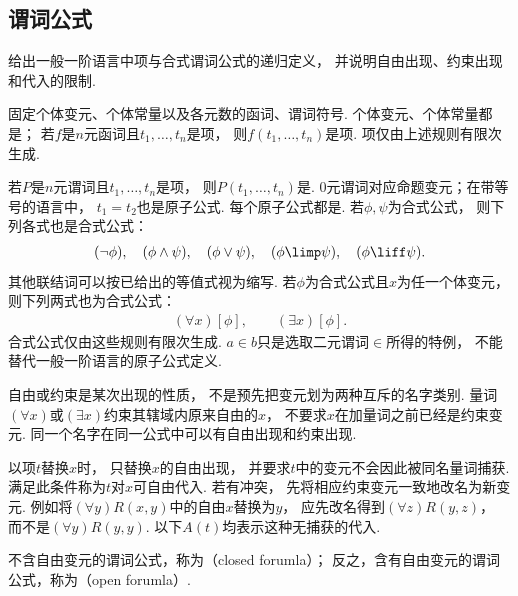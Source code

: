 \subsection{谓词公式}
\begin{example}
    给出一般一阶语言中项与合式谓词公式的递归定义，
    并说明自由出现、约束出现和代入的限制.
    \begin{solution}
        固定个体变元、个体常量以及各元数的函词、谓词符号.
        个体变元、个体常量都是；
        若\(f\)是\(n\)元函词且\(t_1,\dotsc,t_n\)是项，
        则\(f(t_1,\dotsc,t_n)\)是项.
        项仅由上述规则有限次生成.

        若\(P\)是\(n\)元谓词且\(t_1,\dotsc,t_n\)是项，
        则\(P(t_1,\dotsc,t_n)\)是.
        \(0\)元谓词对应命题变元；在带等号的语言中，
        \(t_1=t_2\)也是原子公式.
        每个原子公式都是.
        若\(\phi,\psi\)为合式公式，
        则下列各式也是合式公式：
        \begin{align*}
            (\neg\phi),\quad(\phi\land\psi),\quad(\phi\lor\psi),\quad
            (\phi\limp\psi),\quad(\phi\liff\psi).
        \end{align*}
        其他联结词可以按已给出的等值式视为缩写.
        若\(\phi\)为合式公式且\(x\)为任一个体变元，
        则下列两式也为合式公式：
        \begin{align*}
            (\forall x)[\phi],\qquad(\exists x)[\phi].
        \end{align*}
        合式公式仅由这些规则有限次生成.
        \(a\in b\)只是选取二元谓词\(\in\)所得的特例，
        不能替代一般一阶语言的原子公式定义.

        自由或约束是某次出现的性质，
        不是预先把变元划为两种互斥的名字类别.
        量词\((\forall x)\)或\((\exists x)\)约束其辖域内原来自由的\(x\)，
        不要求\(x\)在加量词之前已经是约束变元.
        同一个名字在同一公式中可以有自由出现和约束出现.

        以项\(t\)替换\(x\)时，
        只替换\(x\)的自由出现，
        并要求\(t\)中的变元不会因此被同名量词捕获.
        满足此条件称为\(t\)对\(x\)可自由代入.
        若有冲突，
        先将相应约束变元一致地改名为新变元.
        例如将\((\forall y)R(x,y)\)中的自由\(x\)替换为\(y\)，
        应先改名得到\((\forall z)R(y,z)\)，
        而不是\((\forall y)R(y,y)\).
        以下\(A(t)\)均表示这种无捕获的代入.
    \end{solution}
\end{example}

不含自由变元的谓词公式，称为（closed forumla）；
反之，含有自由变元的谓词公式，称为（open forumla）.

